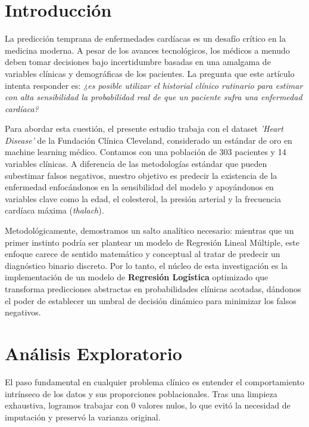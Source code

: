\documentclass[twocolumn,10pt]{article}
\author{\fontsize{10pt}{10pt}\selectfont
  \textbf{Santiago Palacios} \\
  \small Pregrado en Ciencia de Datos, Universidad Externado de Colombia \\
  \small \texttt{santiago.palacios1@est.uexternado.edu.co}
  \and
  \textbf{Angie Tobar} \\
  \small Pregrado en Ciencia de Datos, Universidad Externado de Colombia \\
  \small \texttt{angie.tobar@est.uexternado.edu.co}
  \and
  \textbf{Alejandro Pardo} \\
  \small Pregrado en Ciencia de Datos, Universidad Externado de Colombia \\
  \small \texttt{alejandro.pardo2@est.uexternado.edu.co}
}
\begin{document}

\thispagestyle{alim}


\section{Introducción}

\justifying
La predicción temprana de enfermedades cardíacas es un desafío crítico en la medicina moderna. A pesar de los avances tecnológicos, los médicos a menudo deben tomar decisiones bajo incertidumbre basadas en una amalgama de variables clínicas y demográficas de los pacientes. La pregunta que este artículo intenta responder es: \textit{¿es posible utilizar el historial clínico rutinario para estimar con alta sensibilidad la probabilidad real de que un paciente sufra una enfermedad cardíaca?}

Para abordar esta cuestión, el presente estudio trabaja con el dataset \textit{'Heart Disease'} de la Fundación Clínica Cleveland, considerado un estándar de oro en machine learning médico. Contamos con una población de 303 pacientes y 14 variables clínicas. A diferencia de las metodologías estándar que pueden subestimar falsos negativos, nuestro objetivo es predecir la existencia de la enfermedad enfocándonos en la sensibilidad del modelo y apoyándonos en variables clave como la edad, el colesterol, la presión arterial y la frecuencia cardíaca máxima (\textit{thalach}).

Metodológicamente, demostramos un salto analítico necesario: mientras que un primer instinto podría ser plantear un modelo de Regresión Lineal Múltiple, este enfoque carece de sentido matemático y conceptual al tratar de predecir un diagnóstico binario discreto. Por lo tanto, el núcleo de esta investigación es la implementación de un modelo de \textbf{Regresión Logística} optimizado que transforma predicciones abstractas en probabilidades clínicas acotadas, dándonos el poder de establecer un umbral de decisión dinámico para minimizar los falsos negativos.


\section{Análisis Exploratorio}

El paso fundamental en cualquier problema clínico es entender el comportamiento intrínseco de los datos y sus proporciones poblacionales. Tras una limpieza exhaustiva, logramos trabajar con 0 valores nulos, lo que evitó la necesidad de imputación y preservó la varianza original.
\end{document}
